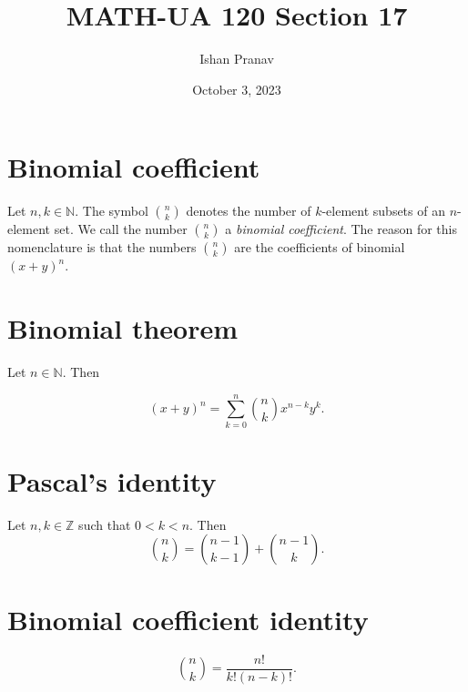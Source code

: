\documentclass[12pt]{article}
\title{MATH-UA 120 Section 17}
\author{Ishan Pranav}
\date{October 3, 2023}
\begin{document}
\maketitle
\section*{Binomial coefficient}
Let $n,k\in\mathbb{N}$. The symbol $\binom{n}{k}$ denotes the number of $k$-element subsets of an $n$-element set. We call the number $\binom{n}{k}$ a \textit{binomial coefficient}. The reason for this nomenclature is that the numbers $\binom{n}{k}$ are the coefficients of binomial $(x+y)^n$.
\section*{Binomial theorem}
Let $n\in\mathbb{N}$. Then

\[(x+y)^n=\sum_{k=0}^n{\binom{n}{k}x^{n-k}y^k.}\]
\section*{Pascal's identity}
Let $n,k\in\mathbb{Z}$ such that $0<k<n$. Then
\[\binom{n}{k}=\binom{n-1}{k-1}+\binom{n-1}{k}.\]
\section*{Binomial coefficient identity}
\[\binom{n}{k}=\frac{n!}{k!(n-k)!}.\]
\end{document}
